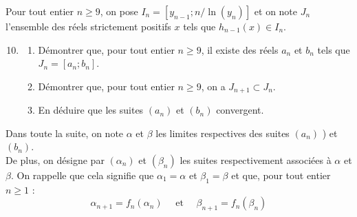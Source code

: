 \documentclass[landscape,twocolumn,leqno,a4paper,10pt]{report} %
\newcommand\n{\noindent}
\newcommand\q{\quad}
\renewcommand{\geq}{\geqslant}
\begin{document}
\n Pour tout entier $n \geq 9$, on pose $I_{n}=\left[y_{n-1} ; n / \ln \left(y_{n}\right)\right]$ et on note $J_{n}$ l'ensemble des réels strictement positifs $x$ tels que $h_{n-1}(x) \in I_{n}$.

\begin{enumerate}\setcounter{enumi}{9}
	\item \begin{enumerate}
		\item Démontrer que, pour tout entier $n \geq 9$, il existe des réels $a_{n}$ et $b_{n}$ tels que $J_{n}=\left[a_{n} ; b_{n}\right]$.
		\item Démontrer que, pour tout entier $n \geq 9$, on a $J_{n+1} \subset J_{n}$.
		\item En déduire que les suites $\left(a_{n}\right)$ et $\left(b_{n}\right)$ convergent.
	\end{enumerate}
\end{enumerate} 

\n Dans toute la suite, on note $\alpha$ et $\beta$ les limites respectives des suites $\left(a_{n}\right)$ ) et $\left(b_{n}\right)$.\\
De plus, on désigne par $\left(\alpha_{n}\right)$ et $\left(\beta_{n}\right)$ les suites respectivement associées à $\alpha$ et $\beta$. On rappelle que cela signifie que $\alpha_{1}=\alpha$ et $\beta_{1}=\beta$ et que, pour tout entier $n \geq 1$ :
$$\alpha_{n+1}=f_{n}\left(\alpha_{n}\right) \q\text{ et }\q \beta_{n+1}=f_{n}\left(\beta_{n}\right)$$
\end{document}
